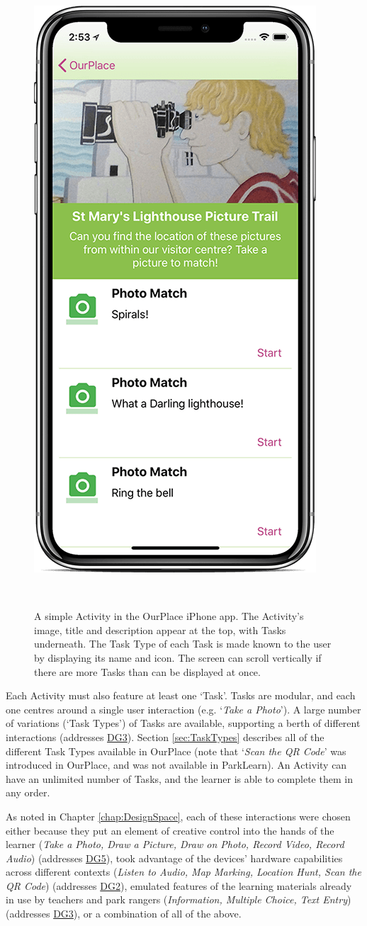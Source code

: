 \begin{figure}
  \centering
  \includegraphics[width=0.33\columnwidth]{images/chapter05/activity.png}
  \caption[A simple OurPlace Activity]{ A simple Activity in the OurPlace iPhone app. The Activity's image, title and description appear at the top, with Tasks underneath. The Task Type of each Task is made known to the user by displaying its name and icon. The screen can scroll vertically if there are more Tasks than can be displayed at once. }~\label{fig:ActivityExample}
\end{figure}

Each Activity must also feature at least one `Task'. Tasks are modular, and each one centres around a single user interaction (e.g. `\textit{Take a Photo}'). A large number of variations (`Task Types') of Tasks are available, supporting a berth of different interactions (addresses \hyperref[DG3]{DG3}). Section \ref{sec:TaskTypes} describes all of the different Task Types available in OurPlace (note that `\textit{Scan the QR Code}' was introduced in OurPlace, and was not available in ParkLearn). An Activity can have an unlimited number of Tasks, and the learner is able to complete them in any order.

As noted in Chapter \ref{chap:DesignSpace}, each of these interactions were chosen either because they put an element of creative control into the hands of the learner (\textit{Take a Photo, Draw a Picture, Draw on Photo, Record Video, Record Audio}) (addresses \hyperref[DG5]{DG5}), took advantage of the devices’ hardware capabilities across different contexts (\textit{Listen to Audio, Map Marking, Location Hunt, Scan the QR Code}) (addresses \hyperref[DG2]{DG2}), emulated features of the learning materials already in use by teachers and park rangers (\textit{Information, Multiple Choice, Text Entry}) (addresses \hyperref[DG3]{DG3}), or a combination of all of the above.

